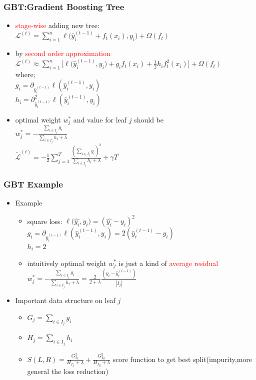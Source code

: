 \documentclass{beamer}
\begin{document}
\begin{frame}
	\frametitle{GBT:Gradient Boosting Tree}
	\begin{itemize}
		\item \textcolor{red}{stage-wise} adding new tree: \\
		$\mathcal{L}^{(t)}= \sum_{i=1}^{n}{\ell{(\widehat{y}_i^{(t-1)}+f_t(x_i),y_i}) + \Omega(f_t)}$  
		\item by \textcolor{red}{second order approximation}
		$\mathcal{L}^{(t)}\approx \sum_{i=1}^{n}[{\ell{(\widehat{y}_i^{(t-1)},y_i}) + g_if_t(x_i)+\frac{1}{2}h_if_t^2(x_i)]+ \Omega(f_t)} $ \\
		where; \\
		$g_i = \partial_{\widehat{y}_i^{(t-1)}}{\ell(\widehat{y}_i^{(t-1)},y_i)}$ \\
		$h_i = \partial_{\widehat{y}_i^{(t-1)}}^2{\ell(\widehat{y}_i^{(t-1)},y_i)}$
		\item optimal weight $w_j^*$ and value for leaf $j$ should be \\
		$w_j^{*} = -\frac{\sum_{i \in I_j}g_i}{\sum_{i \in I_j}h_i +\lambda}$ \\
		$\widetilde{\mathcal{L}}^{(t)}= -\frac{1}{2}\sum_{j=1}^{T}{\frac{(\sum_{i \in I_j}g_i)^2}{\sum_{i \in I_j}h_i +\lambda}} + \gamma T$ 
		
	\end{itemize}
	
\end{frame}

\begin{frame}
	\frametitle{GBT Example}
	\begin{itemize}
		\item Example
			\begin{itemize}
				\item square loss:  $\ell{(\widehat{y_i},y_i})=(\widehat{y_i}-y_i)^2$　
				$g_i = \partial_{\widehat{y}_i^{(t-1)}}{\ell(\widehat{y}_i^{(t-1)},y_i)}=2(\widehat{y}_i^{(t-1)} -y_i)$\\
				$h_i = 2$
				\item intuitively optimal weight $w_j^*$ is just a kind of \textcolor{red}{average residual}\\
				$w_j^{*} = -\frac{\sum_{i \in I_j}g_i}{\sum_{i \in I_j}h_i +\lambda} = \frac{2}{2+\lambda}\frac{(y_i-\widehat{y}_i^{(t-1)})}{|I_j|}$
			\end{itemize}				
		\item Important data structure on leaf $j$
			\begin{itemize}
				\item $G_j = \sum_{i \in I_j}g_i$
				\item $H_j = \sum_{i \in I_j}h_i$
				\item $S(L,R) = \frac{G_{I_L}^2}{H_{I_L}+\lambda} + \frac{G_{I_R}^2}{H_{I_R}+\lambda} $ score function to get best split(impurity,more general the loss reduction)
			\end{itemize}						
	\end{itemize}
\end{frame}
\end{document}
